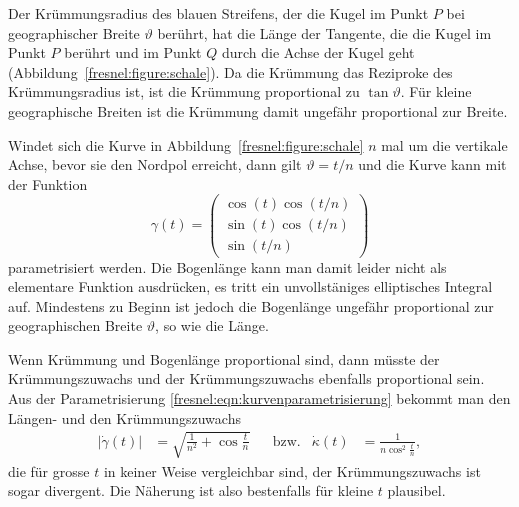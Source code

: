 Der Krümmungsradius des blauen Streifens, der die Kugel im Punkt $P$ bei 
geographischer Breite $\vartheta$ berührt, hat die Länge der Tangente, die
die Kugel im Punkt $P$ berührt und im Punkt $Q$ durch die Achse der
Kugel geht (Abbildung~\ref{fresnel:figure:schale}).
Da die Krümmung das Reziproke des Krümmungsradius ist, ist die
Krümmung proportional zu $\tan\vartheta$.
Für kleine geographische Breiten ist die Krümmung damit ungefähr
proportional zur Breite.

Windet sich die Kurve in Abbildung~\ref{fresnel:figure:schale} $n$
mal um die vertikale Achse, bevor sie den Nordpol erreicht, dann gilt
$\vartheta = t/n$ und die Kurve kann mit der Funktion
\begin{equation}
\gamma(t)
=
\begin{pmatrix}
\cos(t) \cos(t/n) \\
\sin(t) \cos(t/n) \\
\sin(t/n)
\end{pmatrix}
\label{fresnel:eqn:kurvenparametrisierung}
\end{equation}
parametrisiert werden.
Die Bogenlänge kann man damit leider nicht als elementare Funktion
ausdrücken, es tritt ein unvollstäniges elliptisches Integral auf.
Mindestens zu Beginn ist jedoch die Bogenlänge ungefähr proportional
zur geographischen Breite $\vartheta$, so wie die Länge.

Wenn Krümmung und Bogenlänge proportional sind, dann müsste der
Krümmungszuwachs und der Krümmungszuwachs ebenfalls proportional
sein.
Aus der Parametrisierung \eqref{fresnel:eqn:kurvenparametrisierung}
bekommt man den Längen- und den Krümmungszuwachs
\begin{align*}
|\dot{\gamma}(t)|
&=
\sqrt{
\frac{1}{n^2}+\cos\frac{t}{n}
}
&&\text{bzw.}&
\dot{\kappa}(t)
&=
\frac{1}{n\cos^2\frac{t}{n}},
\end{align*}
die für grosse $t$ in keiner Weise vergleichbar sind, der
Krümmungszuwachs ist sogar divergent.
Die Näherung ist also bestenfalls für kleine $t$ plausibel.






